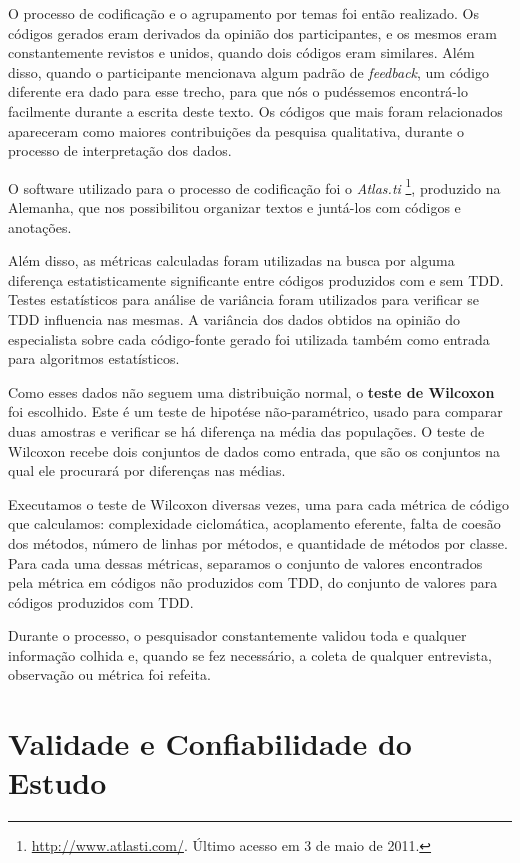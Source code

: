 O processo de codificação e o agrupamento por temas foi então realizado. 
Os códigos gerados eram derivados da opinião dos participantes, e os mesmos 
eram constantemente revistos e unidos, quando dois códigos eram similares.
Além disso, quando o participante mencionava algum padrão de \textit{feedback},
um código diferente era dado para esse trecho, para que nós o pudéssemos encontrá-lo
facilmente durante a escrita deste texto.
Os códigos que mais foram relacionados apareceram como maiores
contribuições da pesquisa qualitativa, durante o processo de interpretação dos
dados. 

O software utilizado para o processo de codificação foi
o \textit{Atlas.ti} \footnote{\url{http://www.atlasti.com/}. Último acesso em 3
de maio de 2011.}, produzido na Alemanha, que nos possibilitou 
organizar textos e juntá-los com códigos e anotações. 

Além disso, as métricas calculadas foram utilizadas na busca por alguma diferença
estatisticamente significante entre códigos produzidos com e sem TDD. 
Testes estatísticos para análise de variância foram utilizados
para verificar se TDD influencia nas mesmas.
A variância dos dados obtidos na opinião do especialista sobre cada código-fonte gerado
foi utilizada também como entrada para algoritmos estatísticos. 

Como esses dados não seguem uma distribuição normal, o \textbf{teste
de Wilcoxon} foi escolhido. Este é um teste de hipotése não-paramétrico,
usado para comparar duas amostras e verificar se há diferença na média das populações.
O teste de Wilcoxon recebe dois conjuntos de dados como entrada, que são os
conjuntos na qual ele procurará por diferenças nas médias.

Executamos o teste de Wilcoxon diversas vezes, uma para cada métrica de código
que calculamos: complexidade ciclomática, acoplamento eferente, falta
de coesão dos métodos, número de linhas por métodos, e quantidade de métodos
por classe. Para cada uma dessas métricas, separamos o conjunto de valores
encontrados pela métrica em códigos não produzidos com TDD, do conjunto de
valores para códigos produzidos com TDD.

Durante o processo, o pesquisador constantemente validou toda e qualquer
informação colhida e, quando se fez necessário, a coleta de qualquer entrevista,
observação ou métrica foi refeita. 

\section{Validade e Confiabilidade do Estudo}
\label{sec:planejamento-validacao}

